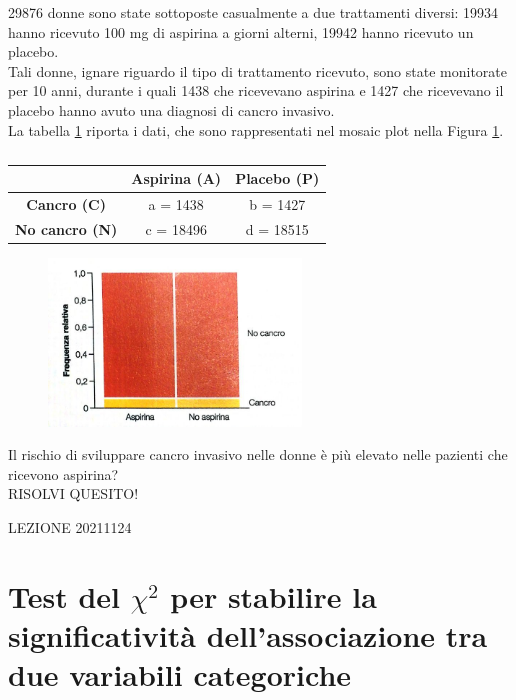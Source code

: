 \documentclass[10pt, draft]{book}
\newcounter{example}[section]
\begin{document}
\begin{example}
29876 donne sono state sottoposte casualmente a due trattamenti diversi: 19934 hanno ricevuto 100 mg di aspirina a giorni alterni, 19942 hanno ricevuto un placebo.
\\
Tali donne, ignare riguardo il tipo di trattamento ricevuto, sono state monitorate per 10 anni, durante i quali 1438 che ricevevano aspirina e 1427 che ricevevano il placebo hanno avuto una diagnosi di cancro invasivo.
\\
La tabella \ref{tabaspirina} riporta i dati, che sono rappresentati nel mosaic plot nella Figura \ref{fig9.2-1}.
\begin{table}[H]
        \centering
        \renewcommand\arraystretch{1.2}
        \begin{tabular}{c|c|c}
        \hline
         & \textbf{Aspirina (A)} & \textbf{Placebo (P)}\\
        \hline
        \textbf{Cancro (C)} & a = 1438 & b = 1427 \\
        \hline
        \textbf{No cancro (N)} & c = 18496 & d = 18515\\
        \hline
        \end{tabular}
        \caption{}
        \label{tabaspirina}
\end{table}\noindent
    \begin{figure}[H]\label{fig9.2-1}
    \centering
    \includegraphics[width=0.6\textwidth]{fig9.2-1.png}
    \caption{\small{}}
    \end{figure}
    Il rischio di sviluppare cancro invasivo nelle donne è più elevato nelle pazienti che ricevono aspirina?
    \\
    RISOLVI QUESITO!
\end{example}

\begin{example}
LEZIONE 20211124
\end{example}

\section{Test del \texorpdfstring{$\chi^2$}{Lg} per stabilire la significatività dell'associazione tra due variabili categoriche}
\end{document}
